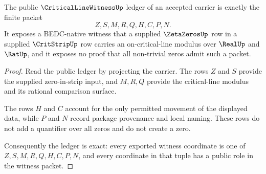 \begin{theorem}
\label{thm:critical-line-witness-ledger-exactness}
The public $\CriticalLineWitnessUp$ ledger of an accepted carrier is exactly the finite packet
$$
Z,S,M,R,Q,H,C,P,N.
$$
It exposes a BEDC-native witness that a supplied $\ZetaZerosUp$ row in a supplied $\CritStripUp$ row carries an on-critical-line modulus over $\RealUp$ and $\RatUp$, and it exposes no proof that all non-trivial zeros admit such a packet.
\end{theorem}
\begin{proof}
Read the public ledger by projecting the carrier. The rows $Z$ and $S$ provide the supplied zero-in-strip input, and $M,R,Q$ provide the critical-line modulus and its rational comparison surface.

The rows $H$ and $C$ account for the only permitted movement of the displayed data, while $P$ and $N$ record package provenance and local naming. These rows do not add a quantifier over all zeros and do not create a zero.

Consequently the ledger is exact: every exported witness coordinate is one of $Z,S,M,R,Q,H,C,P,N$, and every coordinate in that tuple has a public role in the witness packet.
\end{proof}

